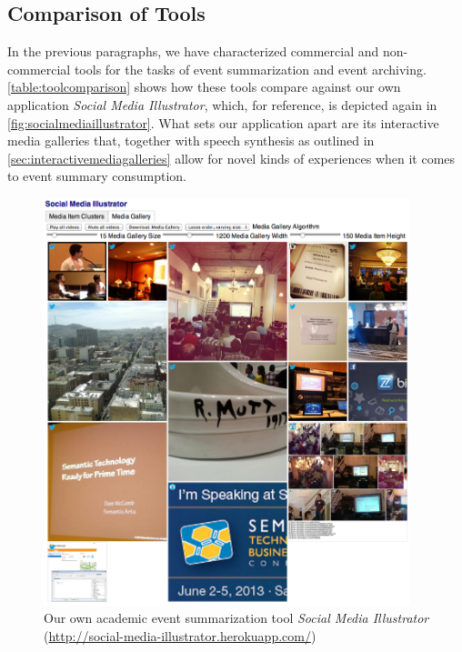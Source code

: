 \subsection{Comparison of Tools}

In the previous paragraphs, we have characterized
commercial and non-commercial tools for the tasks
of event summarization and event archiving.
\autoref{table:toolcomparison} shows how these tools
compare against our own application \emph{Social Media Illustrator},
which, for reference, is depicted again in \autoref{fig:socialmediaillustrator}.
What sets our application apart
are its interactive media galleries that,
together with speech synthesis as outlined in \autoref{sec:interactivemediagalleries}
allow for novel kinds of experiences when it comes to
event summary consumption.

\begin{figure}
  \centering
  \includegraphics[width=0.95\textwidth,height=0.9\textheight,keepaspectratio]{socialmediaillustrator.png}
  \caption[Our own academic event summarization tool \emph{Social Media Illustrator}]{Our own academic event summarization tool \emph{Social Media Illustrator} (\url{http://social-media-illustrator.herokuapp.com/})}
  \label{fig:socialmediaillustrator}
\end{figure}

